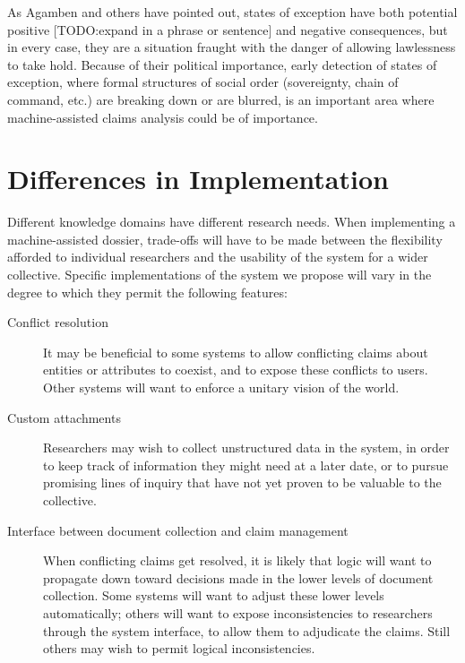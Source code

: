 \documentclass[format=siggraph, review=true]{acmart}
\begin{document}
As Agamben and others have pointed out, states of exception have both potential positive [TODO:expand in a phrase or sentence] and negative consequences, but in every case, they are a situation fraught with the danger of allowing lawlessness to take hold. Because of their political importance, early detection of states of exception, where formal structures of social order (sovereignty, chain of command, etc.) are breaking down or are blurred, is an important area where machine-assisted claims analysis could be of importance. 

\section{Differences in Implementation}

Different knowledge domains have different research needs. When
implementing a machine-assisted dossier, trade-offs will have to be made
between the flexibility afforded to individual researchers and the
usability of the system for a wider collective. Specific implementations
of the system we propose will vary in the degree to which they permit
the following features:

\begin{description}
  \item [Conflict resolution] It may be beneficial to some systems to
    allow conflicting claims about entities or attributes to coexist,
    and to expose these conflicts to users. Other systems will want
    to enforce a unitary vision of the world.

  \item [Custom attachments] Researchers may wish to collect unstructured
    data in the system, in order to keep track of information they might
    need at a later date, or to pursue promising lines of inquiry that
    have not yet proven to be valuable to the collective.

  \item [Interface between document collection and claim management] When
    conflicting claims get resolved, it is likely that logic will
    want to propagate down toward decisions made in the lower levels
    of document collection. Some systems will want to adjust these lower
    levels automatically; others will want to expose inconsistencies to
    researchers through the system interface, to allow them to adjudicate
    the claims. Still others may wish to permit logical inconsistencies.
\end{description}
\end{document}

